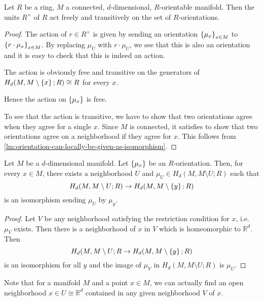 \begin{proposition}
  \label{prop:free-transitive-action-of-units-on-orientations-for-connected-manifolds}
  Let $R$ be a ring,
  $M$ a connected, $d$-dimensional, $R$-orientable manifold.
  Then the units  $R^{\times}$ of $R$ act freely and transitively
  on the set of $R$-orientations.
\end{proposition}

\begin{proof}
  The action of $r\in R^{\times}$ is given by
  sending an orientation $\left\{  \mu_x  \right\}_{x\in M} $
  to $\left\{  r\cdot \mu_x  \right\}_{x\in M} $.
  By replacing $\mu_U$ with $r\cdot \mu_U$,
  we see that this is also an orientation
  and it is easy to check that this is indeed an action.

  The action is obviously free and transitive on the
  generators of $H_d(M, M\setminus \left\{  x  \right\}; R) \cong R$ 
  for every $x$.

  Hence the action on $\left\{  \mu_x  \right\} $ is free.

  To see that the action is transitive,
  we have to show that two orientations agree when they
  agree for a single $x$.
  Since $M$ is connected,
  it satisfies to show that two orientations agree
  on a neighborhood if they agree for $x$.
  This follows from
  \autoref{lm:orientation-can-locally-be-given-as-isomorphism}.
\end{proof}

\begin{lemma}
  \label{lm:orientation-can-locally-be-given-as-isomorphism}
  Let $M$ be a $d$-dimensional manifold.
  Let $\left\{  \mu_x  \right\} $ be an $R$-orientation.
  Then, for every  $x\in M$,
  there exists a neighborhood $U$ and
  $\mu_U \in H_d(M, M \setminus U;R)$ 
  such that
  \[
    H_d(M, M\setminus U;R) \to H_d(M, M\setminus \left\{  y  \right\} ;R)
  \]
  is an isomorphism sending $\mu_U$ by  $\mu_y$.
\end{lemma}

\begin{proof}
  Let $V$ be any neighborhood satisfying
  the restriction condition for $x$, i.e.~$\mu_V$ exists.
  Then there is a neighborhood of $x$ in $V$ which is homeomorphic
  to $\mathbb{R}^d$.
  Then
  \[
    H_d(M, M\setminus U;R \to H_d(M, M\setminus \left\{  y  \right\} ;R)
  \]
  is an isomorphism for all $y$ and the image of  $\mu_V$
  in  $H_d(M, M\setminus U;R)$ is $\mu_U$.
\end{proof}

\begin{oral}
  Note that for a manifold $M$ and a point  $x\in M$,
  we can actually find an open neighborhood $x\in U \cong \mathbb{R}^d$
  contained in any given neighborhood $V$ of  $x$.
\end{oral}

